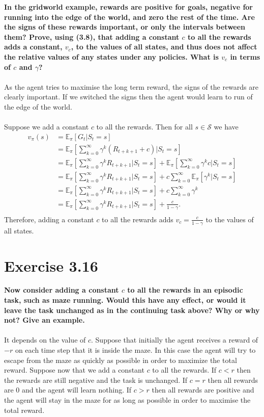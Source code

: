 \documentclass[a4paper,11pt]{article}
\numberwithin{equation}{section}
\theoremstyle{remark}
\newcommand{\E}{\mathbb E}
\begin{document}
\textbf{In the gridworld example, rewards are positive for goals, negative for running into the edge of the world, and zero the rest of the time. Are the signs of these rewards important, or only the intervals between them? Prove, using (3.8), that adding a constant $c$ to all the rewards adds a constant, $v_c$, to the values of all states, and thus does not affect the relative values of any states under any policies. What is $v_c$ in terms of $c$ and $\gamma$?}
\\ \\
As the agent tries to maximise the long term reward, the signs of the rewards are clearly important. If we switched the signs then the agent would learn to run of the edge of the world.  
\\ \\
Suppose we add a constant $c$ to all the rewards. Then for all $s \in \mathcal{S}$ we have
\begin{align*}
	v_\pi(s) & = \E_\pi [G_t | S_t = s] \\
			 & = \E_\pi \left[ \sum_{k=0}^{\infty} \gamma^k (R_{t + k + 1} + c) \Bigg| S_t = s \right] \\
			 & = \E_\pi \left[ \sum_{k=0}^{\infty} \gamma^k R_{t + k + 1} \Bigg| S_t = s \right] 
			 		+ \E_\pi \left[ \sum_{k=0}^{\infty} \gamma^k c \Bigg| S_t = s \right] \\
			 & = \E_\pi \left[ \sum_{k=0}^{\infty} \gamma^k R_{t + k + 1} \Bigg| S_t = s \right] 
			 		+ c \sum_{k=0}^{\infty} \E_\pi [\gamma^k | S_t = s ] \\ 
			 & = \E_\pi \left[ \sum_{k=0}^{\infty} \gamma^k R_{t + k + 1} \Bigg| S_t = s \right] 
			 + c \sum_{k=0}^{\infty} \gamma^k \\ 	
			 & = \E_\pi \left[ \sum_{k=0}^{\infty} \gamma^k R_{t + k + 1} \Bigg| S_t = s \right] 
			 + \frac{c}{1 - \gamma}. \\ 		
\end{align*}
Therefore, adding a constant $c$ to all the rewards adds $v_c = \frac{c}{1 - \gamma}$ to the values of all states.

\section{Exercise 3.16}

\textbf{Now consider adding a constant $c$ to all the rewards in an episodic task, such as maze running. Would this have any effect, or would it leave the task unchanged as in the continuing task above? Why or why not? Give an example.}
\\ \\
It depends on the value of $c$. Suppose that initially the agent receives a reward of $-r$ on each time step that it is inside the maze. In this case the agent will try to escape from the maze as quickly as possible in order to maximize the total reward. Suppose now that we add a constant $c$ to all the rewards. If $c<r$ then the rewards are still negative and the task is unchanged. If $c=r$ then all rewards are 0 and the agent will learn nothing. If $c>r$ then all rewards are positive and the agent will stay in the maze for as long as possible in order to maximise the total reward.
\end{document}
